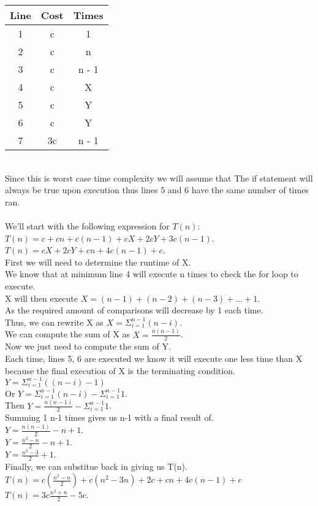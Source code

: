 \documentclass{article}
\begin{document}
\begin{tabular}{|c|c|c|}
    \hline
    Line & Cost & Times\\
    \hline
    1 & c & 1\\
    2 & c & n\\
    3 & c & n - 1\\
    4 & c & X\\
    5 & c & Y\\
    6 & c & Y\\
    7 & 3c & n - 1\\
    \hline
\end{tabular}\\
Since this is worst case time complexity we will assume that 
The if statement will always be true upon execution thus 
lines 5 and 6 have the same number of times ran.\\\\
We'll start with the following expression for $T(n):$\\
$T(n) = c + cn + c(n - 1) + cX + 2cY + 3c(n-1)$.\\
$T(n) = cX + 2cY + cn + 4c(n - 1) + c$.\\
First we will need to determine the runtime of X.\\
We know that at minimum line 4 will execute n times to 
check the for loop to execute.\\
X will then execute $X = (n - 1) + (n - 2) + (n - 3) + ... + 1$.\\
As the required amount of comparisons will decrease by 1 each time.\\
Thus, we can rewrite X as $X = \Sigma^{n - 1}_{i = 1} (n - i)$.\\
We can compute the sum of X as $X = \frac{n(n - 1)}{2}$.\\
Now we just need to compute the sum of Y.\\
Each time, lines 5, 6 are executed we know it will 
execute one less time than X because the final execution 
of X is the terminating condition.\\
$Y = \Sigma^{n - 1}_{i = 1} ((n - i) - 1)$\\
Or $Y = \Sigma^{n - 1}_{i = 1} (n - i) - \Sigma^{n - 1}_{i = 1} 1$.\\
Then $Y = \frac{n(n - 1)}{2} - \Sigma^{n - 1}_{i = 1} 1$.\\
Summing 1 n-1 times gives us n-1 with a final result of.\\
$Y = \frac{n(n - 1)}{2} - n + 1$.\\
$Y = \frac{n^{2} - n}{2} - n + 1$.\\
$Y = \frac{n^{2} - 3}{2} + 1$.\\
Finally, we can substitue back in giving us T(n).\\
$T(n) = c(\frac{n^{2} - n}{2}) + c(n^{2} - 3n) + 2c + cn + 4c(n - 1) + c$
$T(n) = 3c\frac{n^{2} + n}{2} - 5c$.\\
\end{document}

